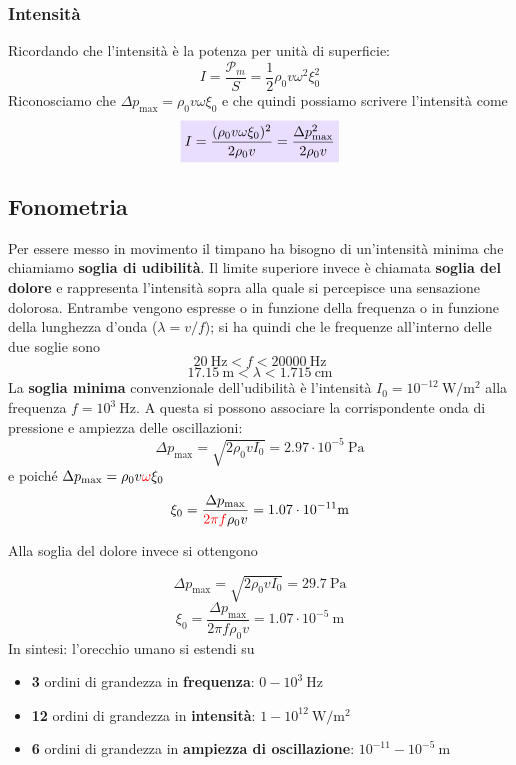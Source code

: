 \documentclass[x11names]{article}
\newcommand{\viola}[1]{\colorbox{yred}{$\displaystyle #1$}}
\begin{document}
	\subsubsection{Intensità}
	Ricordando che l'intensità è la potenza per unità di superficie:
	\[ 
	I = \frac{\mathcal{P}_m }{S} =   \frac{1}{2} \rho_0 v \omega ^2 \xi_0^2
	\]
	Riconosciamo che \(\Delta p_{\text{max}} = \rho_0 v \omega  \xi_0\) e che quindi possiamo scrivere l'intensità come
	\begin{equation}\label{intensita_fono}
		\viola{I = \frac{(\rho_0 v \omega  \xi_0)^2}{2\rho_0 v} = \frac{\Delta p_{\text{max}}^2}{2\rho_0 v}}
	\end{equation}
	
	
	\subsection{Fonometria}
	Per essere messo in movimento il timpano ha bisogno di un'intensità minima che chiamiamo \textbf{soglia di udibilità}. Il limite superiore invece è chiamata \textbf{soglia del dolore} e rappresenta l'intensità sopra alla quale si percepisce una sensazione dolorosa. Entrambe vengono espresse o in funzione della frequenza o in funzione della lunghezza d'onda (\(\lambda=v/f\)); si ha quindi che le frequenze all'interno delle due soglie sono
	\[ 
		\SI{20}{\hertz} < f < \SI{20000}{\hertz}
	\]
	\[ 
		\SI{17.15}{\m} < \lambda < \SI{1.715}{\cm}
	\]
	La\textbf{ soglia minima} convenzionale dell'udibilità è l'intensità \(I_0 = 10^{-12}\SI{}{\watt/\m^2}\) alla frequenza  \(f = 10^3\SI{}{\hertz}\). A questa si possono associare la corrispondente onda di pressione e ampiezza delle oscillazioni:
	\[ 
		\Delta p_{\text{max}} = \sqrt{2\rho_0 v I_0} = 2.97 \cdot 10^{-5} \SI{}{\pascal}
	\]
	e poiché  \(\Delta p_{\text{max}} = \rho_0 v \textcolor{red}{\omega } \xi_0\)
	\[ 
		\xi_0 = \frac{\Delta p_{\text{max}}}{\textcolor{red}{2\pi f}\rho_0 v} = 1.07 \cdot 10^{-11}\SI{}{\m}
	\]
	
	Alla soglia del dolore invece si ottengono 
	
	\[ 
	\Delta p_{\text{max}} = \sqrt{2\rho_0 v I_0} = 29.7 \SI{}{\pascal}
	\]
	\[ 
	\xi_0 = \frac{\Delta p_{\text{max}}}{2\pi f\rho_0 v} = 1.07 \cdot 10^{-5}\SI{}{\m}
	\]
	In sintesi: l'orecchio umano si estendi su
	\begin{itemize}
		\item \textbf{3} ordini di grandezza in \textbf{frequenza}: \(0 - 10^3 \SI{}{\hertz}\)
		\item \textbf{12} ordini di grandezza in \textbf{intensità}: \(1 - 10^12 \SI{}{\watt/\m^2}\)
		\item \textbf{6} ordini di grandezza in \textbf{ampiezza di oscillazione}: \(10^{-11} - 10^{-5} \SI{}{\m}\)
	\end{itemize}
	
\end{document}
